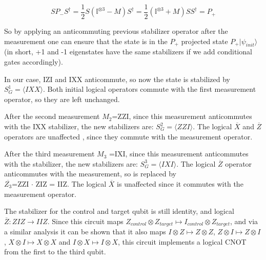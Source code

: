 \begin{equation}
	SP_{-}S^{\dagger} = \frac{1}{2}S\left( 
	\mathbb{I}^{\otimes 3} - M \right) S^{\dagger}
	= \frac{1}{2} \left( \mathbb{I}^{\otimes 3} + M \right)
	SS^{\dagger} = P_{+}
\end{equation}

So by applying an anticommuting previous stabilizer operator
after the measurement one can ensure that the state is in the
$P_{+}$ projected state $P_{+}|\psi_{init}\rangle$ (in short,
+1 and -1 eigenstates have the same stabilizers if we add 
conditional gates accordingly).


In our case, IZI and IXX anticommute,
so now the state is stabilized by $S^{1}_{G} = \langle IXX
\rangle$. Both initial logical operators commute with the first
measurement operator, so they are left unchanged.

After the second measurement $M_{2}$=ZZI, since this
measurement anticommutes with the IXX stabilizer, the new 
stabilizers are: $S^{2}_{G}=\langle ZZI \rangle$. The logical 
$\overline{X}$ and $\overline{Z}$ operators are unaffected
, since they commute with the measurement operator.

After the third measurement $M_{3}$ =IXI, since this measurement
anticommutes with the stabilizer, the new stabilizers are:
$S^{3}_{G}= \langle IXI \rangle$. The logical $\overline{Z}$
operator anticommutes with the measurement, so is replaced by\\
$ \overline{Z_{3}} $=ZZI $\cdot$ ZIZ = IIZ\@. The logical 
$ \overline{X} $ is unaffected since it commutes with the
measurement operator. 

The stabilizer for the control and target qubit is still
identity, and logical $\overline{Z}: ZIZ \rightarrow IIZ$.
Since this circuit maps $Z_{control}\otimes Z_{target} \mapsto I_{control}
 \otimes Z_{target}$,
and via a similar analysis it can be shown that it also maps
$I\otimes Z \mapsto Z \otimes Z$, $Z\otimes I \mapsto Z \otimes I$,
$X\otimes I \mapsto X \otimes X$ and $I\otimes X \mapsto I \otimes X$,
this circuit implements a logical CNOT from the first to the third qubit.
